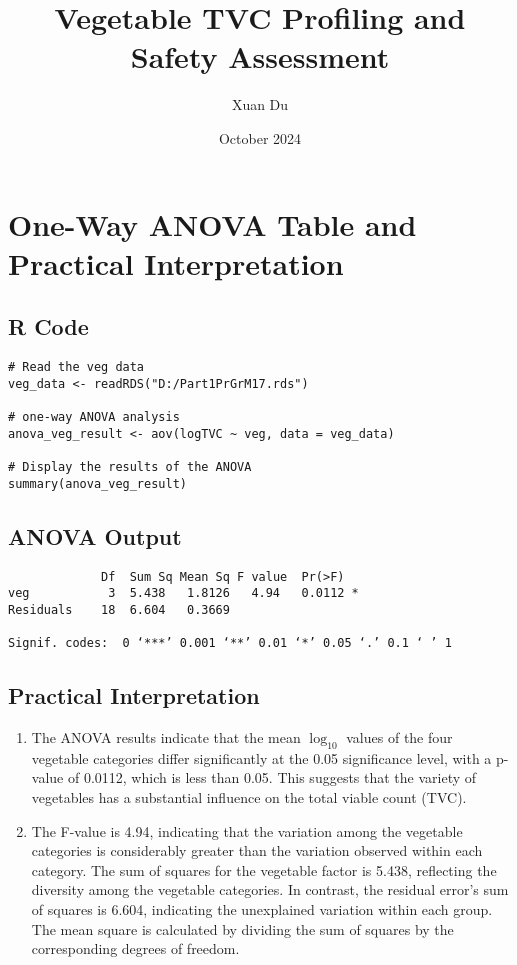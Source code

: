 \documentclass{article}
\title{Vegetable TVC Profiling and Safety Assessment}
\author{Xuan Du}
\date{October 2024}
\begin{document}
\maketitle

\section*{One-Way ANOVA Table and Practical Interpretation}

\subsection*{R Code}
\begin{verbatim}
# Read the veg data
veg_data <- readRDS("D:/Part1PrGrM17.rds")

# one-way ANOVA analysis
anova_veg_result <- aov(logTVC ~ veg, data = veg_data)

# Display the results of the ANOVA
summary(anova_veg_result)
\end{verbatim}

\subsection*{ANOVA Output}
\begin{verbatim}
             Df  Sum Sq Mean Sq F value  Pr(>F)
veg           3  5.438   1.8126   4.94   0.0112 *
Residuals    18  6.604   0.3669

Signif. codes:  0 ‘***’ 0.001 ‘**’ 0.01 ‘*’ 0.05 ‘.’ 0.1 ‘ ’ 1
\end{verbatim}

\subsection*{Practical Interpretation}

\begin{enumerate}
    \item The ANOVA results indicate that the mean $\log_{10}$ values of the four vegetable categories differ significantly at the 0.05 significance level, with a p-value of 0.0112, which is less than 0.05. This suggests that the variety of vegetables has a substantial influence on the total viable count (TVC).

    \item The F-value is 4.94, indicating that the variation among the vegetable categories is considerably greater than the variation observed within each category. The sum of squares for the vegetable factor is 5.438, reflecting the diversity among the vegetable categories. In contrast, the residual error’s sum of squares is 6.604, indicating the unexplained variation within each group. The mean square is calculated by dividing the sum of squares by the corresponding degrees of freedom.
\end{enumerate}
\end{document}
